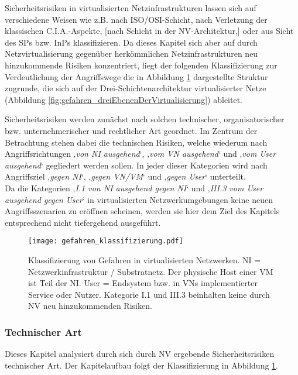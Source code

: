 Sicherheitsrisiken in virtualisierten Netzinfrastrukturen lassen sich auf verschiedene Weisen wie z.B. nach ISO/OSI-Schicht, nach Verletzung der klassischen C.I.A.-Aspekte, [nach Schicht in der NV-Architektur,] oder aus Sicht des SPs bzw. InPs klassifizieren. Da dieses Kapitel sich aber auf durch Netzvirtualisierung gegenüber herkömmlichen Netzinfrastrukturen neu hinzukommende Risiken konzentriert, liegt der folgenden Klassifizierung zur Verdeutlichung der Angriffswege die in Abbildung \ref{fig:gefahren_klassifizierung} dargestellte Struktur zugrunde, die sich auf der Drei-Schichtenarchitektur virtualisierter Netze (Abbildung \ref{fig:gefahren_dreiEbenenDerVirtualisierung}) ableitet.

Sicherheitsrisiken werden zunächst nach solchen technischer, organisatorischer bzw. unternehmerischer und rechtlicher Art geordnet. Im Zentrum der Betrachtung stehen dabei die technischen Risiken, welche wiederum nach Angriffsrichtungen ‚\textit{von NI ausgehend}‘, ‚\textit{vom VN ausgehend}‘ und ‚\textit{vom User ausgehend}‘ gegliedert werden sollen. In jeder dieser Kategorien wird nach Angriffsziel ‚\textit{gegen NI}‘, ‚\textit{gegen VN/VM}‘ und ‚\textit{gegen User}‘ unterteilt. \\
Da die Kategorien ‚\textit{I.1 von NI ausgehend gegen NI}‘ und ‚\textit{III.3 vom User ausgehend gegen User}‘ in virtualisierten Netzwerkumgebungen keine neuen Angriffsszenarien zu eröffnen scheinen, werden sie hier dem Ziel des Kapitels entsprechend nicht tiefergehend ausgeführt. 


\begin{figure}[htb]
	\begin{center}
	\texttt{[image: gefahren\_klassifizierung.pdf]}
	\caption{\label{fig:gefahren_klassifizierung} Klassifizierung von Gefahren in virtualisierten Netzwerken. 
		\newline NI = Netzwerkinfrastruktur / Substratnetz. Der physische Host einer VM ist Teil der NI.
		\newline User = Endsystem bzw. in VNs implementierter Service oder Nutzer.
		\newline Kategorie I.1 und III.3 beinhalten keine durch NV neu hinzukommenden Risiken.}
	\end{center}
\end{figure}





\subsubsection{Technischer Art}
\label{subsubsec:gefahren_virt_technisch}
Dieses Kapitel analysiert durch sich durch NV ergebende Sicherheitsrisiken technischer Art.
Der Kapitelaufbau folgt der Klassifizierung in Abbildung \ref{fig:gefahren_klassifizierung}. 



